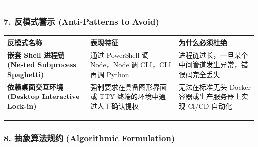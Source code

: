 \begin{center}\rule{0.5\linewidth}{0.5pt}\end{center}

\subsubsection{7. 反模式警示 (Anti-Patterns to
Avoid)}\label{ux53cdux6a21ux5f0fux8b66ux793a-anti-patterns-to-avoid-21}

{\def\LTcaptype{} %
\begin{longtable}[]{@{}
  >{\raggedright\arraybackslash}p{}
  >{\raggedright\arraybackslash}p{}
  >{\raggedright\arraybackslash}p{}@{}}
\toprule\noalign{}
\begin{minipage}[b]{\linewidth}\raggedright
反模式名称
\end{minipage} & \begin{minipage}[b]{\linewidth}\raggedright
表现特征
\end{minipage} & \begin{minipage}[b]{\linewidth}\raggedright
为什么必须杜绝
\end{minipage} \\
\midrule\noalign{}
\endhead
\bottomrule\noalign{}
\endlastfoot
\textbf{嵌套 Shell 进程链 (Nested Subprocess Spaghetti)} & 通过
PowerShell 调 Node，Node 调 CLI，CLI 再调 Python &
进程链过长，一旦某个中间管道发生异常，错误码完全丢失 \\
\textbf{依赖桌面交互环境 (Desktop Interactive Lock-in)} &
强制要求在具备图形界面或 TTY 终端的环境中通过人工确认提权 &
无法在标准无头 Docker 容器或生产服务器上实现 CI/CD 自动化 \\
\end{longtable}
}

\begin{center}\rule{0.5\linewidth}{0.5pt}\end{center}

\subsubsection{8. 抽象算法规约 (Algorithmic
Formulation)}\label{ux62bdux8c61ux7b97ux6cd5ux89c4ux7ea6-algorithmic-formulation-20}

